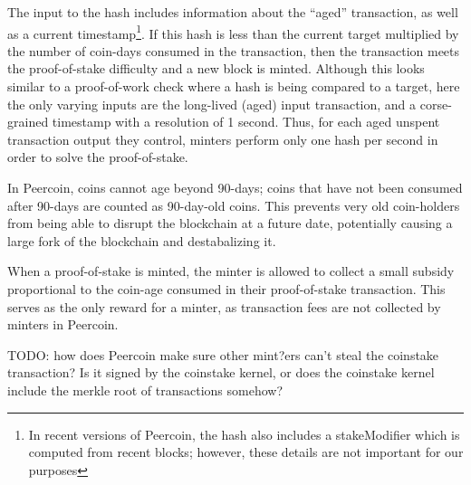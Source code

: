 The input to the hash includes information about the ``aged'' transaction, as
well as a current timestamp\footnote{In recent versions of Peercoin, the hash
also includes a stakeModifier which is computed from recent blocks; however,
these details are not important for our purposes}. If this hash is less than the
current target multiplied by the number of coin-days consumed in the
transaction, then the transaction meets the proof-of-stake difficulty and a new
block is minted. Although this looks similar to a proof-of-work check where a
hash is being compared to a target, here the only varying inputs are the
long-lived (aged) input transaction, and a corse-grained timestamp with a
resolution of 1 second. Thus, for each aged unspent transaction output they
control, minters perform only one hash per second in order to solve the
proof-of-stake.

%



In Peercoin, coins cannot age beyond 90-days; coins that have not been consumed
after 90-days are counted as 90-day-old coins. This prevents very old
coin-holders from being able to disrupt the blockchain at a future date,
potentially causing a large fork of the blockchain and destabalizing it.

When a proof-of-stake is minted, the minter is allowed to collect a small
subsidy proportional to the coin-age consumed in their proof-of-stake
transaction. This serves as the only reward for a minter, as transaction fees are not
collected by minters in Peercoin.

TODO: how does Peercoin make sure other mint?ers can't steal the coinstake
transaction? Is it signed by the coinstake kernel, or does the coinstake kernel
include the merkle root of transactions somehow?


